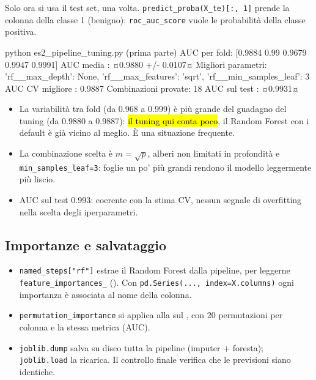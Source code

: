 \begin{tecnica}
Solo ora si usa il test set, una volta. \texttt{predict\_proba(X\_te)[:, 1]} prende la colonna della classe 1 (benigno): \texttt{roc\_auc\_score} vuole le probabilità della classe positiva.
\end{tecnica}

\begin{terminale}{python es2_pipeline_tuning.py  (prima parte)}
AUC per fold: [0.9884 0.99   0.9679 0.9947 0.9991]
AUC media   : ¤0.9880 +/- 0.0107¤
Migliori parametri: {'rf__max_depth': None, 'rf__max_features': 'sqrt', 'rf__min_samples_leaf': 3}
AUC CV migliore   : 0.9887
Combinazioni provate: 18
AUC sul test      : ¤0.9931¤
\end{terminale}

\begin{esempio}
\begin{itemize}
  \item La variabilità tra fold (da 0.968 a 0.999) è più grande del guadagno del tuning (da 0.9880 a 0.9887): \hl{il tuning qui conta poco}, il Random Forest con i default è già vicino al meglio. È una situazione frequente.
  \item La combinazione scelta è $m=\sqrt p$, alberi non limitati in profondità e \texttt{min\_samples\_leaf=3}: foglie un po' più grandi rendono il modello leggermente più liscio.
  \item AUC sul test 0.993: coerente con la stima CV, nessun segnale di overfitting nella scelta degli iperparametri.
\end{itemize}
\end{esempio}

\subsection{Importanze e salvataggio}


\begin{tecnica}[Spiegazione]
\begin{itemize}
  \item {} \texttt{named\_steps["rf"]} estrae il Random Forest dalla pipeline, per leggerne \texttt{feature\_importances\_} (). Con \texttt{pd.Series(..., index=X.columns)} ogni importanza è associata al nome della colonna.
  \item {} \texttt{permutation\_importance} si applica alla  sul , con 20 permutazioni per colonna e la stessa metrica (AUC).
  \item {} \texttt{joblib.dump} salva su disco tutta la pipeline (imputer + foresta); \texttt{joblib.load} la ricarica. Il controllo finale verifica che le previsioni siano identiche.
\end{itemize}
\end{tecnica}

